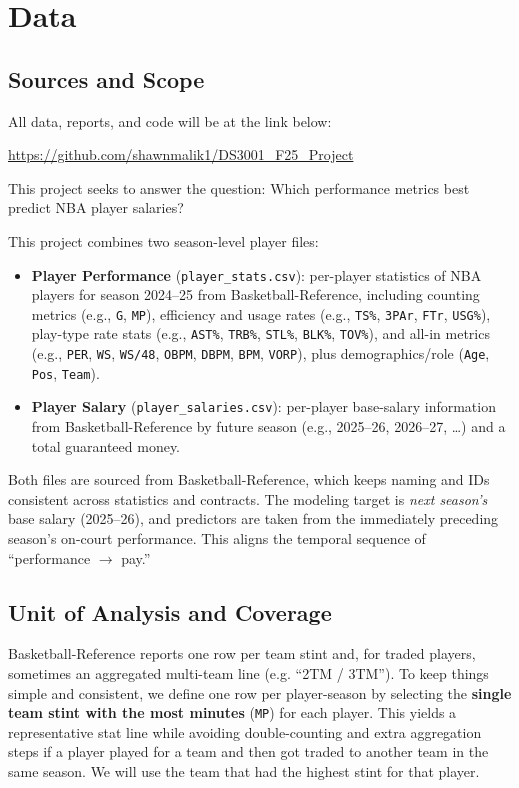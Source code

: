 \documentclass{article}
\theoremstyle{plain}
\theoremstyle{definition}
\theoremstyle{remark}
\begin{document}

\section{Data}
\label{sec:data}

\subsection*{Sources and Scope}
All data, reports, and code will be at the link below:

\url{https://github.com/shawnmalik1/DS3001_F25_Project}

This project seeks to answer the question: Which performance metrics best predict NBA player salaries?

This project combines two season-level player files:
\begin{itemize}
    \item \textbf{Player Performance} (\texttt{player\_stats.csv}): per-player statistics of NBA players for season 2024--25 from Basketball-Reference, including counting metrics (e.g., \texttt{G}, \texttt{MP}), efficiency and usage rates (e.g., \texttt{TS\%}, \texttt{3PAr}, \texttt{FTr}, \texttt{USG\%}), play-type rate stats (e.g., \texttt{AST\%}, \texttt{TRB\%}, \texttt{STL\%}, \texttt{BLK\%}, \texttt{TOV\%}), and all-in metrics (e.g., \texttt{PER}, \texttt{WS}, \texttt{WS/48}, \texttt{OBPM}, \texttt{DBPM}, \texttt{BPM}, \texttt{VORP}), plus demographics/role (\texttt{Age}, \texttt{Pos}, \texttt{Team}).
    
    \item \textbf{Player Salary} (\texttt{player\_salaries.csv}): per-player base-salary information from Basketball-Reference by future season (e.g., 2025--26, 2026--27, \ldots) and a total guaranteed money.
\end{itemize}

Both files are sourced from Basketball-Reference, which keeps naming and IDs consistent across statistics and contracts.
The modeling target is \emph{next season's} base salary (2025--26), and predictors are taken from the immediately preceding season's on-court performance. This aligns the temporal sequence of ``performance $\rightarrow$ pay.''

\subsection*{Unit of Analysis and Coverage}
Basketball-Reference reports one row per team stint and, for traded players, sometimes an aggregated multi-team line (e.g. ``2TM / 3TM''). To keep things simple and consistent, we define one row per player-season by selecting the \textbf{single team stint with the most minutes} (\texttt{MP}) for each player. This yields a representative stat line while avoiding double-counting and extra aggregation steps if a player played for a team and then got traded to another team in the same season. We will use the team that had the highest stint for that player.
\end{document}
